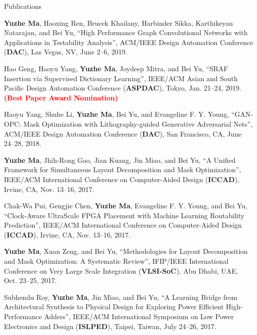 \begin{rSection}{Publications}
\begin{description}[font=\normalfont]
\item[{[C7]}]{
	\textbf{Yuzhe Ma}, Haoxing Ren, Brucek Khailany, Harbinder Sikka, Karthikeyan Natarajan, and Bei Yu, 
     ``High Performance Graph Convolutional Networks with Applications in Testability Analysis'',
     ACM/IEEE Design Automation Conference (\textbf{DAC}), Las Vegas, NV, June 2--6, 2019.
}

\item[{[C6]}]{
	Hao Geng, Haoyu Yang, \textbf{Yuzhe Ma}, Joydeep Mitra, and Bei Yu, 
	``SRAF Insertion via Supervised Dictionary Learning'', 
	IEEE/ACM Asian and South Pacific Design Automation Conference (\textbf{ASPDAC}), Tokyo, Jan. 21--24, 2019. \textbf{\textcolor{red}{(Best Paper Award Nomination)}}
}

\item[{[C5]}]{
	Haoyu Yang, Shuhe Li, \textbf{Yuzhe Ma}, Bei Yu, and Evangeline F. Y. Young,
	``GAN-OPC: Mask Optimization with Lithography-guided Generative Adversarial Nets'', 
	ACM/IEEE Design Automation Conference (\textbf{DAC}), San Francisco, CA, June 24--28, 2018.
}

\item[{[C4]}]{
	\textbf{Yuzhe Ma}, Jhih-Rong Gao, Jian Kuang, Jin Miao, and Bei Yu,
	``A Unified Framework for Simultaneous Layout Decomposition and Mask Optimization'',
	IEEE/ACM International Conference on Computer-Aided Design (\textbf{ICCAD}), Irvine, CA, Nov. 13--16, 2017.
}

\item[{[C3]}]{
	Chak-Wa Pui, Gengjie Chen, \textbf{Yuzhe Ma}, Evangeline F. Y. Young, and Bei Yu,
	``Clock-Aware UltraScale FPGA Placement with Machine Learning Routability Prediction'', 
	IEEE/ACM International Conference on Computer-Aided Design (\textbf{ICCAD}), Irvine, CA, Nov. 13--16, 2017.
}

\item[{[C2]}]{
    \textbf{Yuzhe Ma}, Xuan Zeng, and Bei Yu,
    ``Methodologies for Layout Decomposition and Mask Optimization: A Systematic Review'',
        IFIP/IEEE International Conference on Very Large Scale Integration (\textbf{VLSI-SoC}), Abu Dhabi, UAE, Oct. 23--25, 2017. %
}

\item[{[C1]}]{
    Subhendu Roy, \textbf{Yuzhe Ma}, Jin Miao, and Bei Yu,
    ``A Learning Bridge from Architectural Synthesis to Physical Design for Exploring Power Efficient High-Performance Adders'',
    IEEE/ACM International Symposium on Low Power Electronics and Design (\textbf{ISLPED}), Taipei, Taiwan, July 24--26, 2017.
}


\end{description}
\end{rSection}
